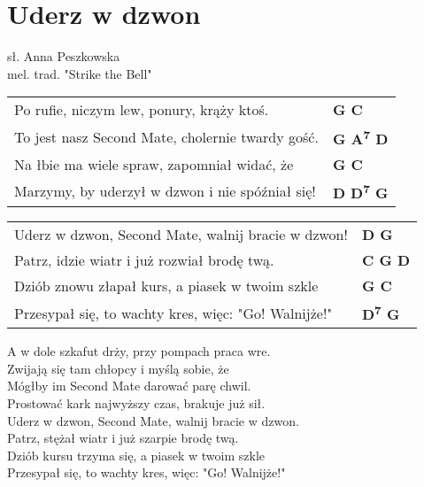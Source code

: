 \section{Uderz w dzwon}

sł. Anna Peszkowska\\
mel. trad. "Strike the Bell"\\

\vspace{2em}
\begin{tabular}{@{}p{10cm}@{}l@{}}
Po rufie, niczym lew, ponury, krąży ktoś. & \bfseries G C\\
To jest nasz Second Mate, cholernie twardy gość. & \bfseries G A\textsuperscript{7} D\\
Na łbie ma wiele spraw, zapomniał widać, że & \bfseries G C\\
Marzymy, by uderzył w dzwon i nie spóźniał się! & \bfseries D D\textsuperscript{7} G\\
\end{tabular}

\begin{tabular}{@{}p{10cm}@{}l@{}}
Uderz w dzwon, Second Mate, walnij bracie w dzwon! & \bfseries D G\\
Patrz, idzie wiatr i już rozwiał brodę twą. & \bfseries C G D\\
Dziób znowu złapał kurs, a piasek w twoim szkle & \bfseries G C\\
Przesypał się, to wachty kres, więc: "Go! Walnijże!" & \bfseries D\textsuperscript{7} G\\
\end{tabular}

\vspace{1em}
A w dole szkafut drży, przy pompach praca wre. \\
Zwijają się tam chłopcy i myślą sobie, że \\
Mógłby im Second Mate darować parę chwil. \\
Prostować kark najwyższy czas, brakuje już sił. \\

Uderz w dzwon, Second Mate, walnij bracie w dzwon. \\
Patrz, stężał wiatr i już szarpie brodę twą. \\
Dziób kursu trzyma się, a piasek w twoim szkle \\
Przesypał się, to wachty kres, więc: "Go! Walnijże!" \\

